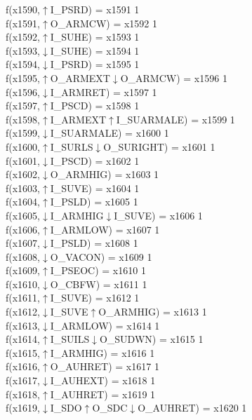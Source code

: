 f(x1590,$\uparrow$I\_PSRD) = x1591 {1} \\
f(x1591,$\uparrow$O\_ARMCW) = x1592 {1} \\
f(x1592,$\uparrow$I\_SUHE) = x1593 {1} \\
f(x1593,$\downarrow$I\_SUHE) = x1594 {1} \\
f(x1594,$\downarrow$I\_PSRD) = x1595 {1} \\
f(x1595,$\uparrow$O\_ARMEXT$\downarrow$O\_ARMCW) = x1596 {1} \\
f(x1596,$\downarrow$I\_ARMRET) = x1597 {1} \\
f(x1597,$\uparrow$I\_PSCD) = x1598 {1} \\
f(x1598,$\uparrow$I\_ARMEXT$\uparrow$I\_SUARMALE) = x1599 {1} \\
f(x1599,$\downarrow$I\_SUARMALE) = x1600 {1} \\
f(x1600,$\uparrow$I\_SURLS$\downarrow$O\_SURIGHT) = x1601 {1} \\
f(x1601,$\downarrow$I\_PSCD) = x1602 {1} \\
f(x1602,$\downarrow$O\_ARMHIG) = x1603 {1} \\
f(x1603,$\uparrow$I\_SUVE) = x1604 {1} \\
f(x1604,$\uparrow$I\_PSLD) = x1605 {1} \\
f(x1605,$\downarrow$I\_ARMHIG$\downarrow$I\_SUVE) = x1606 {1} \\
f(x1606,$\uparrow$I\_ARMLOW) = x1607 {1} \\
f(x1607,$\downarrow$I\_PSLD) = x1608 {1} \\
f(x1608,$\downarrow$O\_VACON) = x1609 {1} \\
f(x1609,$\uparrow$I\_PSEOC) = x1610 {1} \\
f(x1610,$\downarrow$O\_CBFW) = x1611 {1} \\
f(x1611,$\uparrow$I\_SUVE) = x1612 {1} \\
f(x1612,$\downarrow$I\_SUVE$\uparrow$O\_ARMHIG) = x1613 {1} \\
f(x1613,$\downarrow$I\_ARMLOW) = x1614 {1} \\
f(x1614,$\uparrow$I\_SUILS$\downarrow$O\_SUDWN) = x1615 {1} \\
f(x1615,$\uparrow$I\_ARMHIG) = x1616 {1} \\
f(x1616,$\uparrow$O\_AUHRET) = x1617 {1} \\
f(x1617,$\downarrow$I\_AUHEXT) = x1618 {1} \\
f(x1618,$\uparrow$I\_AUHRET) = x1619 {1} \\
f(x1619,$\downarrow$I\_SDO$\uparrow$O\_SDC$\downarrow$O\_AUHRET) = x1620 {1} \\
